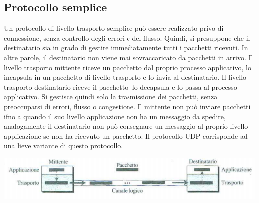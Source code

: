 \documentclass[12pt]{report}
\begin{document}
	\subsection{Protocollo semplice}
	Un protocollo di livello trasporto semplice può essere realizzato privo di connessione, senza controllo degli errori e del flusso. Quindi, si presuppone che il destinatario sia in grado di gestire immediatamente tutti i pacchetti ricevuti. In altre parole, il destinatario non viene mai sovraccaricato da pacchetti in arrivo. Il livello trasporto mittente riceve un pacchetto dal proprio processo applicativo, lo incapsula in un pacchetto di livello trasporto e lo invia al destinatario. Il livello trasporto destinatario riceve il pacchetto, lo decapsula e lo passa al processo applicativo. Si gestisce quindi solo la trasmissione dei pacchetti, senza preoccuparsi di errori, flusso o congestione. Il mittente non può inviare pacchetti ifno a quando il suo livello applicazione non ha un messaggio da spedire, analogamente il destinatario non può consegnare un messaggio al proprio livello applicazione se non ha ricevuto un pacchetto. Il protocollo UDP corrisponde ad una lieve variante di questo protocollo.
	\begin{center}
		\includegraphics[scale=0.5]{assets/simple-prot.png}
	\end{center}
\end{document}

